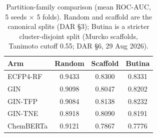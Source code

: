 \begin{table}[htbp]
  \centering
  \caption{Partition-family comparison (mean ROC-AUC, 5 seeds $\times$ 5 folds).
  Random and scaffold are the canonical splits (DAR \S3); Butina is a stricter
  cluster-disjoint split (Murcko scaffolds, Tanimoto cutoff 0.55; DAR \S6, 29 Aug 2026).}
  \label{tab:butina-partition}
  \begin{tabular}{lccc}
    \toprule
    Arm & Random & Scaffold & Butina \\
    \midrule
    ECFP4-RF & 0.9433 & 0.8300 & 0.8331 \\
    GIN & 0.9098 & 0.8047 & 0.8202 \\
    GIN-TFP & 0.9084 & 0.8138 & 0.8232 \\
    GIN-TNE & 0.8918 & 0.8090 & 0.8191 \\
    ChemBERTa & 0.9121 & 0.7867 & 0.7776 \\
    \bottomrule
  \end{tabular}
\end{table}
